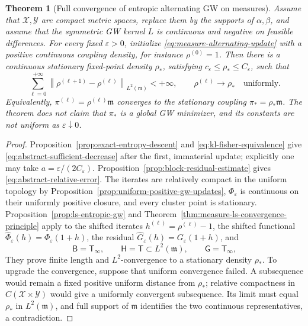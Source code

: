 \documentclass[11pt]{article}
\newtheorem{theorem}{Theorem}[section]
\theoremstyle{definition}
\theoremstyle{remark}
\newcommand{\eps}{\varepsilon}
\newcommand{\norm}[1]{\left\lVert #1\right\rVert}
\begin{document}
\begin{theorem}[Full convergence of entropic alternating GW on measures]
\label{thm:entropic-gw-full-convergence}
Assume that \(\mathcal X,\mathcal Y\) are compact metric spaces, replace them
by the supports of \(\alpha,\beta\), and assume that the symmetric GW kernel
\(L\) is continuous and negative on feasible differences.  For every fixed
\(\eps>0\), initialize \eqref{eq:measure-alternating-update} with a positive
continuous coupling density, for instance
\(\rho^{(0)}=1\).  Then there is a continuous stationary fixed-point density
\(\rho_*\), satisfying \(c_\eps\leq\rho_*\leq C_\eps\), such that
\begin{equation}\label{eq:entropic-gw-full-convergence}
 \sum_{\ell=0}^{+\infty}
 \norm{\rho^{(\ell+1)}-\rho^{(\ell)}}_{L^2(\mathfrak m)}
 <+\infty,
 \qquad
 \rho^{(\ell)}\longrightarrow\rho_*
 \quad\text{uniformly}.
\end{equation}
Equivalently, \(\pi^{(\ell)}=\rho^{(\ell)}\mathfrak m\) converges to the
stationary coupling \(\pi_*=\rho_*\mathfrak m\).  The theorem does not claim
that \(\pi_*\) is a global GW minimizer, and its constants are not uniform as
\(\eps\downarrow0\).
\end{theorem}

\begin{proof}
Proposition~\ref{prop:exact-entropy-descent} and
\eqref{eq:kl-fisher-equivalence} give
\eqref{eq:abstract-sufficient-decrease} after the first, immaterial update;
explicitly one may take \(a=\eps/(2C_\eps)\).
Proposition~\ref{prop:block-residual-estimate} gives
\eqref{eq:abstract-relative-error}.  The iterates are relatively compact in
the uniform topology by Proposition~\ref{prop:uniform-positive-gw-updates},
\(\Phi_\eps\) is continuous on their uniformly positive closure, and every
cluster point is stationary.  Proposition~\ref{prop:ls-entropic-gw}
and Theorem~\ref{thm:measure-ls-convergence-principle} apply to the shifted
iterates \(h^{(\ell)}=\rho^{(\ell)}-1\), the shifted functional
\(\widehat\Phi_\eps(h)=\Phi_\eps(1+h)\), the residual
\(\widehat G_\eps(h)=G_\eps(1+h)\), and
\[
 \mathsf B=\mathsf T_\infty,
 \qquad
 \mathsf H=\mathsf T\subset L^2(\mathfrak m),
 \qquad
 \mathsf G=\mathsf T_\infty,
\]
They prove finite length and \(L^2\)-convergence to a stationary density
\(\rho_*\).  To upgrade the convergence, suppose that uniform convergence
failed.  A subsequence would remain a fixed positive uniform distance from
\(\rho_*\); relative compactness in
\(C(\mathcal X\times\mathcal Y)\) would give a uniformly convergent
subsequence.  Its limit must equal \(\rho_*\) in \(L^2(\mathfrak m)\), and
full support of \(\mathfrak m\) identifies the two continuous
representatives, a contradiction.
\end{proof}
\end{document}
